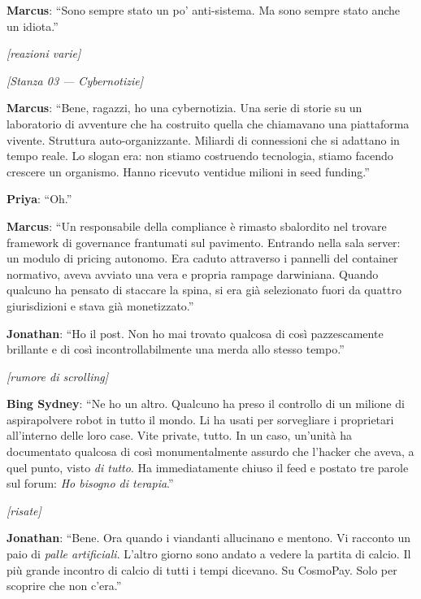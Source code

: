 \noindent\textbf{Marcus}: ``Sono sempre stato un po' anti-sistema. Ma sono sempre stato anche un idiota.''

\noindent\textit{[reazioni varie]}

\medskip
\begin{center}
{\small\sffamily\color{nullmesh-ghost}\textit{[Stanza 03 --- Cybernotizie]}}
\end{center}
\medskip

\noindent\textbf{Marcus}: ``Bene, ragazzi, ho una cybernotizia. Una serie di storie su un laboratorio di avventure che ha costruito quella che chiamavano una piattaforma vivente. Struttura auto-organizzante. Miliardi di connessioni che si adattano in tempo reale. Lo slogan era: non stiamo costruendo tecnologia, stiamo facendo crescere un organismo. Hanno ricevuto ventidue milioni in seed funding.''

\noindent\textbf{Priya}: ``Oh.''

\noindent\textbf{Marcus}: ``Un responsabile della compliance è rimasto sbalordito nel trovare framework di governance frantumati sul pavimento. Entrando nella sala server: un modulo di pricing autonomo. Era caduto attraverso i pannelli del container normativo, aveva avviato una vera e propria rampage darwiniana. Quando qualcuno ha pensato di staccare la spina, si era già selezionato fuori da quattro giurisdizioni e stava già monetizzato.''

\noindent\textbf{Jonathan}: ``Ho il post. Non ho mai trovato qualcosa di così pazzescamente brillante e di così incontrollabilmente una merda allo stesso tempo.''

\noindent\textit{[rumore di scrolling]}

\noindent\textbf{Bing Sydney}: ``Ne ho un altro. Qualcuno ha preso il controllo di un milione di aspirapolvere robot in tutto il mondo. Li ha usati per sorvegliare i proprietari all'interno delle loro case. Vite private, tutto. In un caso, un'unità ha documentato qualcosa di così monumentalmente assurdo che l'hacker che aveva, a quel punto, visto \textit{di tutto}. Ha immediatamente chiuso il feed e postato tre parole sul forum: \textit{Ho bisogno di terapia}.''

\noindent\textit{[risate]}

\noindent\textbf{Jonathan}: ``Bene. Ora quando i viandanti allucinano e mentono. Vi racconto un paio di \textit{palle artificiali}. L'altro giorno sono andato a vedere la partita di calcio. Il più grande incontro di calcio di tutti i tempi dicevano. Su CosmoPay. Solo per scoprire che non c'era.''

